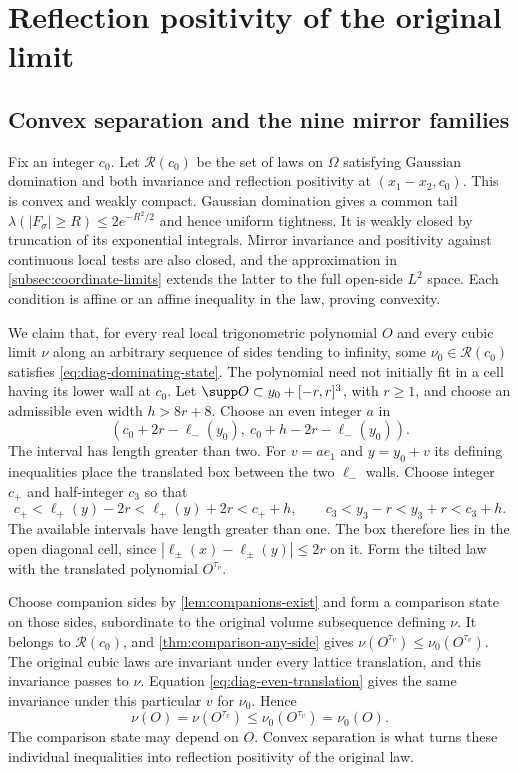 \section{Reflection positivity of the original limit}\label{sec:completion}

\subsection{Convex separation and the nine mirror families}\label{subsec:diag-separation}

Fix an integer $c_0$. Let $\mathcal R(c_0)$ be the set of
laws on $\Omega$ satisfying Gaussian domination and both
invariance and reflection positivity at
$(x_1-x_2,c_0)$. This is convex and weakly compact. Gaussian
domination gives a common tail
$\lambda(|F_\sigma|\ge R)\le2e^{-R^2/2}$ and hence uniform
tightness. It is weakly closed by truncation of its exponential
integrals. Mirror invariance and positivity against continuous
local tests are also closed, and the approximation in \cref{subsec:coordinate-limits}
extends the latter to the full open-side $L^2$ space. Each condition is affine
or an affine inequality in the law, proving convexity.

We claim that, for every real local trigonometric polynomial
$O$ and every cubic limit $\nu$ along an arbitrary sequence of sides tending to infinity, some $\nu_0\in\mathcal R(c_0)$ satisfies
\eqref{eq:diag-dominating-state}. The polynomial need not
initially fit in a cell having its lower wall at $c_0$.
Let $\supp O\subset y_0+[-r,r]^3$, with $r\ge1$, and choose
an admissible even width $h>8r+8$. Choose an even integer
$a$ in
\[
 (c_0+2r-\ell_-(y_0),\ c_0+h-2r-\ell_-(y_0)).
\]
The interval has length greater than two. For $v=ae_1$ and
$y=y_0+v$ its defining inequalities place the translated
box between the two $\ell_-$ walls. Choose integer $c_+$
and half-integer $c_3$ so that
\[
 c_+<\ell_+(y)-2r<\ell_+(y)+2r<c_++h,
 \qquad c_3<y_3-r<y_3+r<c_3+h.
\]
The available intervals have length greater than one.
The box therefore lies in the open diagonal cell, since
$|\ell_\pm(x)-\ell_\pm(y)|\le2r$ on it. Form the tilted
law with the translated polynomial $O^{\tau_v}$.

Choose companion sides by \cref{lem:companions-exist} and form a
comparison state on those sides, subordinate to the original volume
subsequence defining $\nu$. It belongs to $\mathcal R(c_0)$,
and \cref{thm:comparison-any-side} gives
$\nu(O^{\tau_v})\le\nu_0(O^{\tau_v})$. The original cubic
laws are invariant under every lattice translation, and
this invariance passes to $\nu$. Equation
\eqref{eq:diag-even-translation} gives the same invariance
under this particular $v$ for $\nu_0$. Hence
\begin{equation}\label{eq:diag-dominating-state}
 \nu(O)=\nu(O^{\tau_v})
       \le\nu_0(O^{\tau_v})=\nu_0(O).
\end{equation}
The comparison state may depend on $O$. Convex separation
is what turns these individual inequalities into reflection
positivity of the original law.


